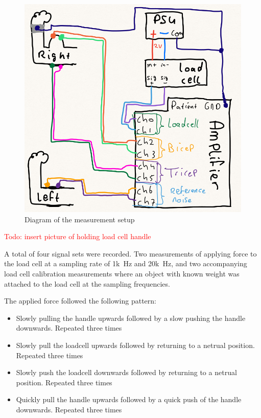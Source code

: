 \begin{figure}[h!t]
	\begin{center}
		\includegraphics[width=1.0\columnwidth]{images/measurement_setup_diagram.png}
	\end{center}
	\caption{Diagram of the measurement setup}
	\label{fig:measurement_setup_diagram}
\end{figure}

\textcolor{red}{Todo: insert picture of holding load cell handle}

A total of four signal sets were recorded. Two measurements of applying force to the load cell at a sampling rate of \SI{1k}{\hertz} and \SI{20k}{\hertz}, and two accompanying load cell calibration measurements where an object with known weight was attached to the load cell at the sampling frequencies.

The applied force followed the following pattern:
\begin{itemize}
    \item Slowly pulling the handle upwards followed by a slow pushing the handle downwards. Repeated three times
    \item Slowly pull the loadcell upwards followed by returning to a netrual position. Repeated three times
    \item Slowly push the loadcell downwards followed by returning to a netrual position. Repeated three times
    \item Quickly pull the handle upwards followed by a quick push of the handle downwards. Repeated three times
\end{itemize}


